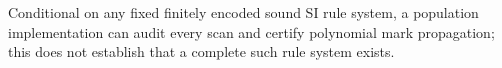 Conditional on any fixed finitely encoded sound SI rule system, a population implementation can audit every scan and certify polynomial mark propagation; this does not establish that a complete such rule system exists.
